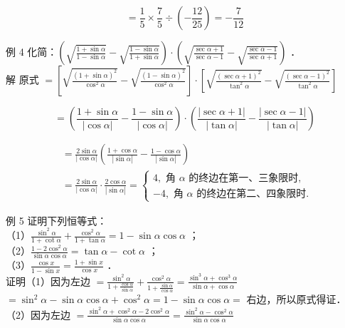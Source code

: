 \documentclass[10pt]{article}
\begin{document}
\[
=\frac{1}{5} \times \frac{7}{5} \div\left(-\frac{12}{25}\right)=-\frac{7}{12}
\]

例 4 化简：\(\left(\sqrt{\frac{1+\sin \alpha}{1-\sin \alpha}}-\sqrt{\frac{1-\sin \alpha}{1+\sin \alpha}}\right) \cdot\left(\sqrt{\frac{\sec \alpha+1}{\sec \alpha-1}}-\sqrt{\frac{\sec \alpha-1}{\sec \alpha+1}}\right)\) ．\\
解 原式 \(=\left[\sqrt{\frac{(1+\sin \alpha)^{2}}{\cos ^{2} \alpha}}-\sqrt{\frac{(1-\sin \alpha)^{2}}{\cos ^{2} \alpha}}\right] \cdot\left[\sqrt{\frac{(\sec \alpha+1)^{2}}{\tan ^{2} \alpha}}-\sqrt{\frac{(\sec \alpha-1)^{2}}{\tan ^{2} \alpha}}\right]\)

\[
=\left(\frac{1+\sin \alpha}{|\cos \alpha|}-\frac{1-\sin \alpha}{|\cos \alpha|}\right) \cdot\left(\frac{|\sec \alpha+1|}{|\tan \alpha|}-\frac{|\sec \alpha-1|}{|\tan \alpha|}\right)
\]

\[
\begin{aligned}
& =\frac{2 \sin \alpha}{|\cos \alpha|}\left(\frac{1+\cos \alpha}{|\sin \alpha|}-\frac{1-\cos \alpha}{|\sin \alpha|}\right) \\
& =\frac{2 \sin \alpha}{|\cos \alpha|} \cdot \frac{2 \cos \alpha}{|\sin \alpha|}=\left\{\begin{array}{l}
4, \text { 角 } \alpha \text { 的终边在第一、三象限时, } \\
-4, \text { 角 } \alpha \text { 的终边在第二、四象限时. }
\end{array}\right.
\end{aligned}
\]

例 5 证明下列恒等式：\\
（1）\(\frac{\sin ^{2} \alpha}{1+\cot \alpha}+\frac{\cos ^{2} \alpha}{1+\tan \alpha}=1-\sin \alpha \cos \alpha\) ；\\
（2）\(\frac{1-2 \cos ^{2} \alpha}{\sin \alpha \cos \alpha}=\tan \alpha-\cot \alpha\) ；\\
（3）\(\frac{\cos x}{1-\sin x}=\frac{1+\sin x}{\cos x}\) ．\\
证明（1）因为左边 \(=\frac{\sin ^{2} \alpha}{1+\frac{\cos \alpha}{\sin \alpha}}+\frac{\cos ^{2} \alpha}{1+\frac{\sin \alpha}{\cos \alpha}}=\frac{\sin ^{3} \alpha+\cos ^{3} \alpha}{\sin \alpha+\cos \alpha}\) \(=\sin ^{2} \alpha-\sin \alpha \cos \alpha+\cos ^{2} \alpha=1-\sin \alpha \cos \alpha=\) 右边，所以原式得证．\\
（2）因为左边 \(=\frac{\sin ^{2} \alpha+\cos ^{2} \alpha-2 \cos ^{2} \alpha}{\sin \alpha \cos \alpha}=\frac{\sin ^{2} \alpha-\cos ^{2} \alpha}{\sin \alpha \cos \alpha}\)
\end{document}
